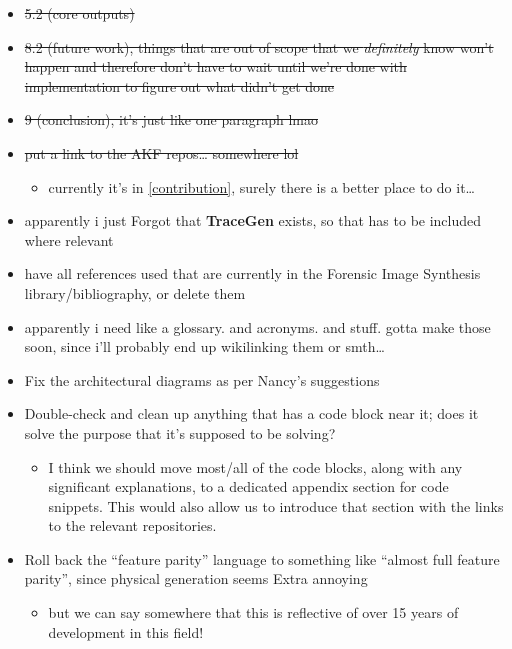 \begin{itemize}
\tightlist
\item
  \st{5.2 (core outputs)}
\item
  \st{8.2 (future work), things that are out of scope that we
  \emph{definitely} know won't happen and therefore don't have to wait
  until we're done with implementation to figure out what didn't get
  done}
\item
  \st{9 (conclusion), it's just like one paragraph lmao}
\item
  \st{put a link to the AKF repos\ldots{} somewhere lol}

  \begin{itemize}
  \tightlist
  \item
    currently it's in \autoref{contribution},
    surely there is a better place to do it\ldots{}
  \end{itemize}
\item
  apparently i just Forgot that \textbf{TraceGen} exists, so that has to
  be included where relevant
\item
  have all references used that are currently in the Forensic Image
  Synthesis library/bibliography, or delete them
\item
  apparently i need like a glossary. and acronyms. and stuff. gotta make
  those soon, since i'll probably end up wikilinking them or
  smth\ldots{}
\item
  Fix the architectural diagrams as per Nancy's suggestions
\item
  Double-check and clean up anything that has a code block near it; does
  it solve the purpose that it's supposed to be solving?

  \begin{itemize}
  \tightlist
  \item
    I think we should move most/all of the code blocks, along with any
    significant explanations, to a dedicated appendix section for code
    snippets. This would also allow us to introduce that section with
    the links to the relevant repositories.
  \end{itemize}
\item
  Roll back the ``feature parity'' language to something like ``almost
  full feature parity'', since physical generation seems Extra annoying

  \begin{itemize}
  \tightlist
  \item
    but we can say somewhere that this is reflective of over 15 years of
    development in this field!
  \end{itemize}
\end{itemize}

